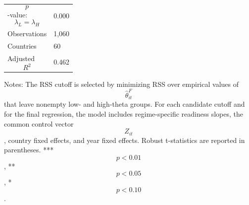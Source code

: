 \begin{table}[H]
\begin{threeparttable}
\begin{tabularx}{\textwidth}{lY}
$$p$$-value: $$\lambda_L=\lambda_H$$ & 0.000 \\
Observations & 1,060 \\
Countries & 60 \\
Adjusted $$R^2$$ & 0.462 \\
\bottomrule
\end{tabularx}
\begin{tablenotes}[flushleft]\footnotesize
\item Notes: The RSS cutoff is selected by minimizing RSS over empirical values of $$\widehat{\theta}^{F}_{it}$$ that leave nonempty low- and high-theta groups. For each candidate cutoff and for the final regression, the model includes regime-specific readiness slopes, the common control vector $$Z_{it}$$, country fixed effects, and year fixed effects. Robust t-statistics are reported in parentheses. *** $$p<0.01$$, ** $$p<0.05$$, * $$p<0.10$$.
\end{tablenotes}
\end{threeparttable}
\end{table}
